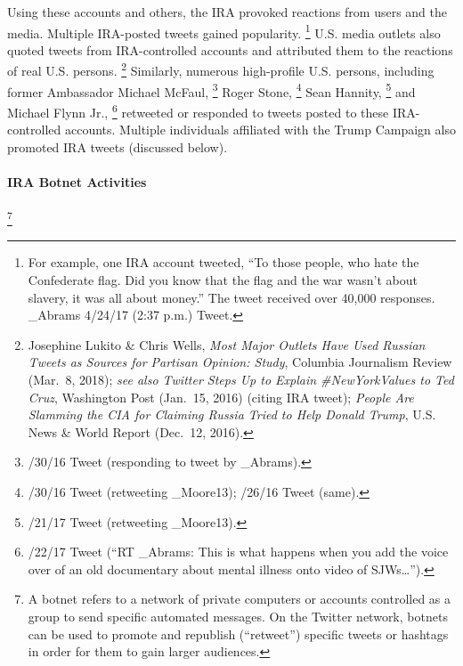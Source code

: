 Using these accounts and others, the IRA provoked reactions from users and the media.
Multiple IRA-posted tweets gained popularity.%
\footnote{For example, one IRA account tweeted, ``To those people, who hate the Confederate flag.
Did you know that the flag and the war wasn't about slavery, it was all about money.''
The tweet received over 40,000 responses.
\@Jenn\_Abrams 4/24/17 (2:37 p.m.) Tweet.}
U.S. media outlets also quoted tweets from IRA-controlled accounts and attributed them to the reactions of real U.S. persons.%
\footnote{Josephine Lukito \& Chris Wells, \textit{Most Major Outlets Have Used Russian Tweets as Sources for Partisan Opinion: Study}, Columbia Journalism Review (Mar.~8, 2018);
\textit{see also Twitter Steps Up to Explain \#NewYorkValues to Ted Cruz}, Washington Post (Jan.~15, 2016) (citing IRA tweet);
\textit{People Are Slamming the CIA for Claiming Russia Tried to Help Donald Trump}, U.S. News \& World Report (Dec.~12, 2016).}
Similarly, numerous high-profile U.S. persons, including former Ambassador Michael McFaul,%
\footnote{/30/16 Tweet (responding to tweet by \@Jenn\_Abrams).} Roger Stone,%
\footnote{/30/16 Tweet (retweeting \@Pamela\_Moore13);
/26/16 Tweet (same).}
Sean Hannity,%
\footnote{/21/17 Tweet (retweeting \@Pamela\_Moore13).}
and Michael Flynn Jr.,%
\footnote{/22/17 Tweet (``RT \@Jenn\_Abrams: This is what happens when you add the voice over of an old documentary about mental illness onto video of SJWs\dots'').}
retweeted or responded to tweets posted to these IRA-controlled accounts.
Multiple individuals affiliated with the Trump Campaign also promoted IRA tweets (discussed below).

\paragraph{IRA Botnet Activities}

\footnote{A botnet refers to a network of private computers or accounts controlled as a group to send specific automated messages.
On the Twitter network, botnets can be used to promote and republish (``retweet'') specific tweets or hashtags in order for them to gain larger audiences.}

